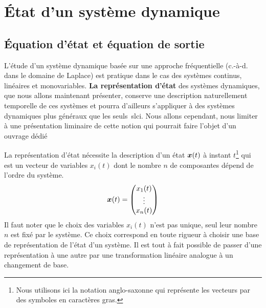 \section{\'Etat d'un système dynamique}
\subsection{\'Equation d'état et équation de sortie}
L'étude d'un système dynamique basée sur une approche fréquentielle (c.-à-d. 
dans le domaine de Laplace) est pratique dans le cas des systèmes continus, 
linéaires et monovariables. \textbf{La représentation d'état} des systèmes 
dynamiques, que nous allons maintenant présenter, conserve une description 
naturellement temporelle de ces systèmes et pourra d'ailleurs s'appliquer 
à des systèmes dynamiques plus généraux que les seuls~\gls{slci}. 
Nous allons cependant, nous limiter à une présentation
liminaire de cette notion qui pourrait faire l'objet d'un ouvrage dédié

La représentation d'état nécessite la description d'un état 
$\boldsymbol{x}(t)$ à instant $t$\footnote{Nous utilisons ici la notation anglo-saxonne qui
représente les vecteurs par des symboles en caractères gras.} qui est un 
vecteur de variables $x_i(t)$ dont le nombre $n$ de composantes dépend 
de l'ordre du système.
\begin{align*}
    \boldsymbol{x} (t) = \begin{pmatrix}
            x_1(t)\\
            \vdots\\
             x_n(t)
            \end{pmatrix}
\end{align*}
Il faut noter que le choix des variables $x_i(t)$ n'est pas unique, seul leur
nombre $n$ est fixé par le système. Ce choix correspond en toute rigueur
à choisir une base de représentation de l'état d'un système. Il est tout à 
fait possible de passer d'une représentation à une autre par une transformation
linéaire analogue à un changement de base.

